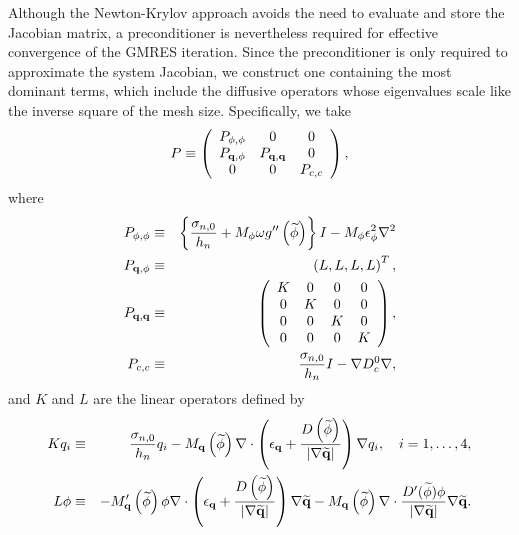 Although the Newton-Krylov approach avoids the need to evaluate and
store the Jacobian matrix, a preconditioner is nevertheless required
for effective convergence of the GMRES iteration.  Since the
preconditioner is only required to approximate the system Jacobian, we
construct one containing the most dominant terms, which include the
diffusive operators whose eigenvalues scale like the inverse square of
the mesh size.  Specifically, we take
%
\begin{equation}
  P \equiv \left (
    \begin{array}{ccc}
      P_{\phi,\phi} & 0 & 0 \\
      P_{{\bf q},\phi} & P_{{\bf q},{\bf q}} & 0 \\
      0 & 0 & P_{c,c}
    \end{array}
  \right ),
\label{eq:Pdef}
\end{equation}
%
where
%
\begin{eqnarray}
  P_{\phi,\phi} &\equiv& \left \{ \frac{\sigma_{n,0}}{h_n} + 
    M_\phi\omega g''\left(\widetilde{\phi}\right)
    \right \} I - M_\phi \epsilon_{\phi}^2 \nabla^2 \\
  P_{{\bf q},\phi} &\equiv& \left (
    L, L, L, L \right )^T, \\
  P_{{\bf q},{\bf q}} &\equiv& \left (
    \begin{array}{cccc}
      K & 0 & 0 & 0 \\
      0 & K & 0 & 0 \\
      0 & 0 & K & 0 \\
      0 & 0 & 0 & K
    \end{array}
    \right ), \\
  P_{c,c} &\equiv& \frac{\sigma_{n,0}}{h_n} I - \nabla D_c^0\nabla,
\end{eqnarray}
%
and $K$ and $L$ are the linear operators defined by
%
\begin{eqnarray}
  Kq_i &\equiv & \frac{\sigma_{n,0}}{h_n} q_i - M_{\bf q} \left (
    \widetilde{\phi} \right ) \nabla \cdot \left (
    \epsilon_{\bf q} +
    \frac{D \left ( \widetilde{\phi} \right ) }
    { | \nabla \widetilde{\bf q} | } \right )
    \nabla q_i, \hspace{1em} i = 1, \ldots, 4, \\
  L\phi &\equiv& 
    - M'_{\bf q} \left ( \widetilde{\phi} \right ) \phi \nabla \cdot
    \left( \epsilon_{\bf q} +
    \frac{D \left ( \widetilde{\phi} \right ) }
    { | \nabla \widetilde{\bf q} | }
    \right) \nabla \widetilde{\bf q}
    - M_{\bf q} \left ( \widetilde{\phi} \right ) \nabla \cdot 
    \frac{D'(\widetilde{\phi}) \phi}{ | \nabla \widetilde{\bf q} | }
    \nabla \widetilde{\bf q}.
\end{eqnarray}
